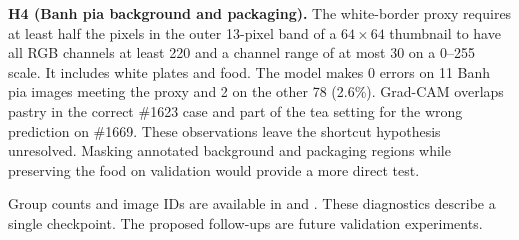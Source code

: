 \textbf{H4 (Banh pia background and packaging).} The white-border proxy requires at least half the pixels in the outer 13-pixel band of a $64\times64$ thumbnail to have all RGB channels at least 220 and a channel range of at most 30 on a 0--255 scale. It includes white plates and food. The model makes 0 errors on 11 Banh pia images meeting the proxy and 2 on the other 78 (2.6\%). Grad-CAM overlaps pastry in the correct \#1623 case and part of the tea setting for the wrong prediction on \#1669. These observations leave the shortcut hypothesis unresolved. Masking annotated background and packaging regions while preserving the food on validation would provide a more direct test.

Group counts and image IDs are available in  and . These diagnostics describe a single checkpoint. The proposed follow-ups are future validation experiments.
\clearpage
